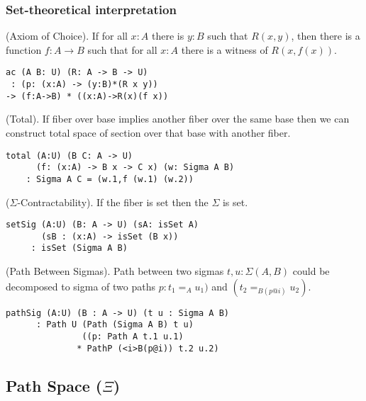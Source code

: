 \documentclass{article}
\begin{document}
\subsubsection*{Set-theoretical interpretation}

\begin{theorem} (Axiom of Choice).
If for all $x : A$ there is $y : B$ such that $R(x,y)$,
then there is a function $f : A \rightarrow B$
such that for all $x : A$ there is a witness of $R(x,f(x))$.
\begin{lstlisting}
ac (A B: U) (R: A -> B -> U)
 : (p: (x:A) -> (y:B)*(R x y))
-> (f:A->B) * ((x:A)->R(x)(f x))
\end{lstlisting}
\end{theorem}

\begin{theorem} (Total).
If fiber over base implies another fiber
over the same base then we can construct total space of section
over that base with another fiber.
\begin{lstlisting}
total (A:U) (B C: A -> U)
      (f: (x:A) -> B x -> C x) (w: Sigma A B)
    : Sigma A C = (w.1,f (w.1) (w.2))
\end{lstlisting}
\end{theorem}

\begin{theorem} ($\Sigma$-Contractability). If the fiber is set then the $\Sigma$ is set.
\begin{lstlisting}
setSig (A:U) (B: A -> U) (sA: isSet A)
       (sB : (x:A) -> isSet (B x))
     : isSet (Sigma A B)
\end{lstlisting}
\end{theorem}

\begin{theorem} (Path Between Sigmas).
Path between two sigmas $t,u: \Sigma(A,B)$ could be decomposed to
sigma of two paths $p:t_1=_{A}u_1)$ and $(t_2=_{B(p@i)}u_2)$.
\begin{lstlisting}
pathSig (A:U) (B : A -> U) (t u : Sigma A B)
      : Path U (Path (Sigma A B) t u)
               ((p: Path A t.1 u.1)
              * PathP (<i>B(p@i)) t.2 u.2)
\end{lstlisting}
\end{theorem}

\subsection{Path Space ($\Xi$)}
\end{document}

